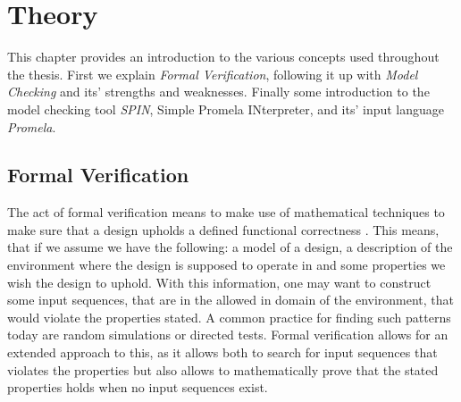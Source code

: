 \chapter{Theory}


This chapter provides an introduction to the various concepts used throughout the thesis. First we explain \textit{Formal Verification}, following it up with \textit{Model Checking} and its' strengths and weaknesses. Finally some introduction to the model checking tool \textit{SPIN}, Simple Promela INterpreter, and its' input language \textit{Promela}.




\section{Formal Verification}

The act of formal verification means to make use of mathematical techniques to make sure that a design upholds a defined functional correctness \cite{bjesse2005formal}.
This means, that if we assume we have the following: a model of a design, a description of the environment where the design is supposed to operate in and some properties we wish the design to uphold. With this information, one may want to construct some input sequences, that are in the allowed in domain of the environment, that would violate the properties stated. A common practice for finding such patterns today are random simulations or directed tests.
Formal verification allows for an extended approach to this, as it allows both to search for input sequences that violates the properties but also allows to mathematically prove that the stated properties holds when no input sequences exist.

